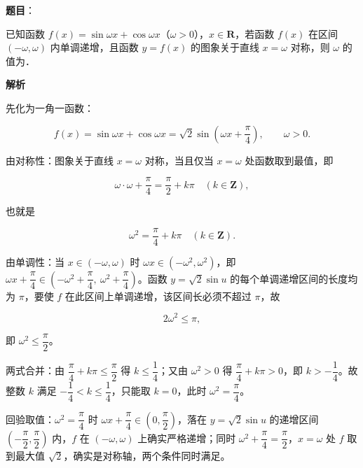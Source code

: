 \begin{answer}

\end{answer}
\begin{answer}

\textbf{题目}：

已知函数 \(f(x)=\sin\omega x+\cos\omega x\)（\(\omega>0\)），\(x\in\mathbf{R}\)，若函数 \(f(x)\) 在区间 \((-\omega,\omega)\) 内单调递增，且函数 \(y=f(x)\) 的图象关于直线 \(x=\omega\) 对称，则 \(\omega\) 的值为\gkblank{}．

\textbf{解析}

先化为一角一函数：

\nopagebreak[4]
\[
f(x)=\sin\omega x+\cos\omega x=\sqrt2\sin\left(\omega x+\dfrac{\pi}{4}\right),\qquad \omega>0.
\]

由对称性：图象关于直线 \(x=\omega\) 对称，当且仅当 \(x=\omega\) 处函数取到最值，即

\nopagebreak[4]
\[
\omega\cdot\omega+\dfrac{\pi}{4}=\dfrac{\pi}{2}+k\pi\quad(k\in\mathbf{Z}),
\]

也就是

\nopagebreak[4]
\[
\omega^{2}=\dfrac{\pi}{4}+k\pi\quad(k\in\mathbf{Z}).
\]

由单调性：当 \(x\in(-\omega,\omega)\) 时 \(\omega x\in(-\omega^{2},\omega^{2})\)，即 \(\omega x+\dfrac{\pi}{4}\in\left(-\omega^{2}+\dfrac{\pi}{4},\ \omega^{2}+\dfrac{\pi}{4}\right)\)。函数 \(y=\sqrt2\sin u\) 的每个单调递增区间的长度均为 \(\pi\)，要使 \(f\) 在此区间上单调递增，该区间长必须不超过 \(\pi\)，故

\nopagebreak[4]
\[
2\omega^{2}\leqslant\pi,
\]

即 \(\omega^{2}\leqslant\dfrac{\pi}{2}\)。

两式合并：由 \(\dfrac{\pi}{4}+k\pi\leqslant\dfrac{\pi}{2}\) 得 \(k\leqslant\dfrac14\)；又由 \(\omega^{2}>0\) 得 \(\dfrac{\pi}{4}+k\pi>0\)，即 \(k>-\dfrac14\)。故整数 \(k\) 满足 \(-\dfrac14<k\leqslant\dfrac14\)，只能取 \(k=0\)，此时 \(\omega^{2}=\dfrac{\pi}{4}\)。

回验取值：\(\omega^{2}=\dfrac{\pi}{4}\) 时 \(\omega x+\dfrac{\pi}{4}\in\left(0,\dfrac{\pi}{2}\right)\)，落在 \(y=\sqrt2\sin u\) 的递增区间 \(\left(-\dfrac{\pi}{2},\dfrac{\pi}{2}\right)\) 内，\(f\) 在 \((-\omega,\omega)\) 上确实严格递增；同时 \(\omega^{2}+\dfrac{\pi}{4}=\dfrac{\pi}{2}\)，\(x=\omega\) 处 \(f\) 取到最大值 \(\sqrt2\)，确实是对称轴，两个条件同时满足。


\end{answer}
